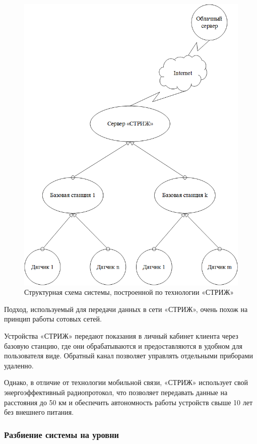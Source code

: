 \begin{figure}[h]
	\centering\includegraphics[width=0.7\linewidth]{img/Swift}
	\caption{Структурная схема системы, построенной по технологии «СТРИЖ»}
	\label{fig:Swift}
\end{figure}

Подход, используемый для передачи данных в сети «СТРИЖ», очень похож на принцип работы сотовых сетей.

Устройства «СТРИЖ» передают показания в личный кабинет клиента через базовую станцию, где они обрабатываются и предоставляются в удобном для пользователя виде. Обратный канал позволяет управлять отдельными приборами удаленно\cite{2}.

Однако, в отличие от технологии мобильной связи, «СТРИЖ» использует свой энергоэффективный радиопротокол, что позволяет передавать данные на расстояния до 50 км и обеспечить автономность работы устройств свыше 10 лет без внешнего питания.


\subsubsection{Разбиение системы на уровни}

